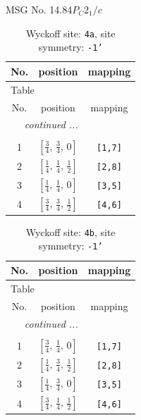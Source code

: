 \documentclass[fleqn,8pt]{jsarticle}
\begin{document}
\setcounter{MaxMatrixCols}{32}

\renewcommand{\tablename}{Table~}
\renewcommand{\figurename}{Figure~}
\begin{center}
\LARGE
MSG No. 14.84\quad$P_{C}2_{1}/c$
\end{center}
\renewcommand{\arraystretch}{1.2}
\begin{longtable}{ccc}
\caption{Wyckoff site: {\tt 4a}, site symmetry: {\tt -1'}}
 \\
 \hline \hline
No. & position & mapping \\ \hline \endfirsthead

\multicolumn{2}{l}{\tablename\ \thetable{}} \\
 \hline \hline
No. & position & mapping \\ \hline \endhead

 \hline \hline
\multicolumn{2}{r}{\footnotesize\it continued ...} \\ \endfoot

 \hline \hline
\multicolumn{2}{r}{} \\ \endlastfoot

1 & $\left[ \frac{3}{4},\, \frac{3}{4},\, 0 \right]$ & {\tt [1,7]} \\ \hline
2 & $\left[ \frac{1}{4},\, \frac{1}{4},\, \frac{1}{2} \right]$ & {\tt [2,8]} \\ \hline
3 & $\left[ \frac{1}{4},\, \frac{1}{4},\, 0 \right]$ & {\tt [3,5]} \\ \hline
4 & $\left[ \frac{3}{4},\, \frac{3}{4},\, \frac{1}{2} \right]$ & {\tt [4,6]} \\
\end{longtable}
\renewcommand{\arraystretch}{1.2}
\begin{longtable}{ccc}
\caption{Wyckoff site: {\tt 4b}, site symmetry: {\tt -1'}}
 \\
 \hline \hline
No. & position & mapping \\ \hline \endfirsthead

\multicolumn{2}{l}{\tablename\ \thetable{}} \\
 \hline \hline
No. & position & mapping \\ \hline \endhead

 \hline \hline
\multicolumn{2}{r}{\footnotesize\it continued ...} \\ \endfoot

 \hline \hline
\multicolumn{2}{r}{} \\ \endlastfoot

1 & $\left[ \frac{3}{4},\, \frac{1}{4},\, 0 \right]$ & {\tt [1,7]} \\ \hline
2 & $\left[ \frac{1}{4},\, \frac{3}{4},\, \frac{1}{2} \right]$ & {\tt [2,8]} \\ \hline
3 & $\left[ \frac{1}{4},\, \frac{3}{4},\, 0 \right]$ & {\tt [3,5]} \\ \hline
4 & $\left[ \frac{3}{4},\, \frac{1}{4},\, \frac{1}{2} \right]$ & {\tt [4,6]} \\
\end{longtable}
\end{document}
